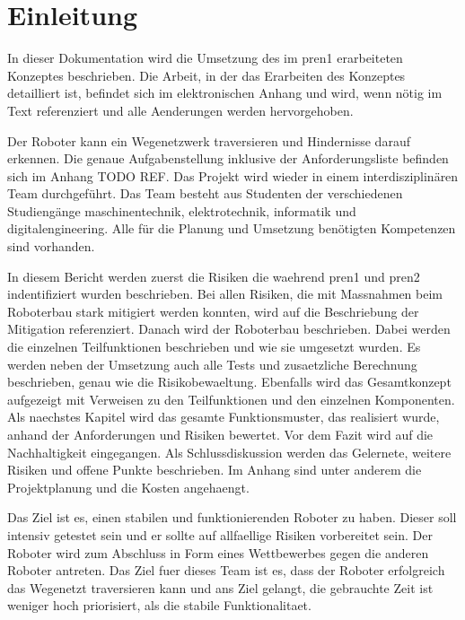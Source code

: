 \section{Einleitung}

In dieser Dokumentation wird die Umsetzung des im \acrfull{pren1} erarbeiteten Konzeptes beschrieben. 
Die Arbeit, in der das Erarbeiten des Konzeptes detailliert ist, befindet sich im elektronischen Anhang und wird, wenn nötig im Text referenziert und alle Aenderungen werden hervorgehoben.

Der Roboter kann ein Wegenetzwerk traversieren und Hindernisse darauf erkennen. Die genaue Aufgabenstellung inklusive der Anforderungsliste befinden sich im Anhang TODO REF. Das Projekt wird wieder in einem interdisziplinären Team durchgeführt. Das Team besteht aus Studenten der verschiedenen Studiengänge \acrfull{maschinentechnik}, \acrfull{elektrotechnik}, \acrfull{informatik} und \acrfull{digitalengineering}. Alle für die Planung und Umsetzung benötigten Kompetenzen sind vorhanden.

In diesem Bericht werden zuerst die Risiken die waehrend \acrshort{pren1} und \acrshort{pren2} indentifiziert wurden beschrieben. Bei allen Risiken, die mit Massnahmen beim Roboterbau stark mitigiert werden konnten, wird auf die Beschriebung der Mitigation referenziert. Danach wird der Roboterbau beschrieben. Dabei werden die einzelnen Teilfunktionen beschrieben und wie sie umgesetzt wurden. Es werden neben der Umsetzung auch alle Tests und zusaetzliche Berechnung beschrieben, genau wie die Risikobewaeltung. Ebenfalls wird das Gesamtkonzept aufgezeigt mit Verweisen zu den Teilfunktionen und den einzelnen Komponenten. Als naechstes Kapitel wird das gesamte Funktionsmuster, das realisiert wurde, anhand der Anforderungen und Risiken bewertet. Vor dem Fazit wird auf die Nachhaltigkeit eingegangen. Als Schlussdiskussion werden das Gelernete, weitere Risiken und offene Punkte beschrieben. Im Anhang sind unter anderem die Projektplanung und die Kosten angehaengt.


Das Ziel ist es, einen stabilen und funktionierenden Roboter zu haben. Dieser soll intensiv getestet sein und er sollte auf allfaellige Risiken vorbereitet sein. Der Roboter wird zum Abschluss in Form eines Wettbewerbes gegen die anderen Roboter antreten. Das Ziel fuer dieses Team ist es, dass der Roboter erfolgreich das Wegenetzt traversieren kann und ans Ziel gelangt, die gebrauchte Zeit ist weniger hoch priorisiert, als die stabile Funktionalitaet.
